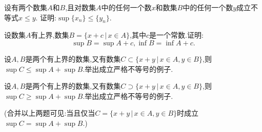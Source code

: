 \documentclass[windows,list,answers]{BHCexam}
\begin{document}
\begin{questions}
    \question
    设有两个数集$A$和$B$,且对数集$A$中的任何一个数$x$和数集$B$中的任何一个数$y$成立不等式$x\leqslant y$.
    证明:$\sup\{x_n\}\leqslant\{y_n\}$.

    \question
    设数集$A$有上界,数集$B=\{x+c\,\lvert\, x\in A\}$,其中$c$是一个常数.证明:
    \[\sup B=\sup A+c,\inf B=\inf A+c.
    \]

    \question
    设$A,B$是两个有上界的数集,又有数集$C\subset \{x+y\,\lvert\, x\in A,y\in B\}$,则
    $\sup C\leqslant \sup A+\sup B$.举出成立严格不等号的例子.

    \question
    设$A,B$是两个有上界的数集,又有数集$C\supset  \{x+y\,\lvert\, x\in A,y\in B\}$,则
    $\sup C\geqslant \sup A+\sup B$.举出成立严格不等号的例子.
    \begin{solution}{1cm}

    \end{solution}
    (合并以上两题可见:当且仅当$C=\{x+y\,\lvert\, x\in A,y\in B\}$时成立$\sup C=\sup A+\sup B$.)

\end{questions}
\end{document}
